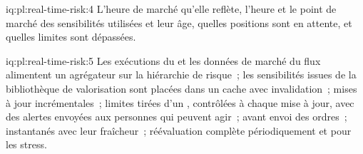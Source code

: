 \begin{solution}{iq:pl:real-time-risk:4}
L'heure de marché qu'elle reflète, l'heure et le point de marché des sensibilités utilisées et leur âge, quelles positions sont en attente, et quelles
limites sont dépassées.
\end{solution}

\begin{solution}{iq:pl:real-time-risk:5}
Les exécutions du  et les données de marché du flux alimentent un agrégateur sur la hiérarchie de risque~; les sensibilités issues de la bibliothèque de
valorisation sont placées dans un cache avec invalidation~; mises à jour incrémentales~; limites tirées d'un , contrôlées à chaque mise à jour, avec des alertes envoyées aux personnes qui peuvent
agir~;  avant envoi des ordres~; instantanés avec leur fraîcheur~; réévaluation complète périodiquement et pour les stress.
\end{solution}
